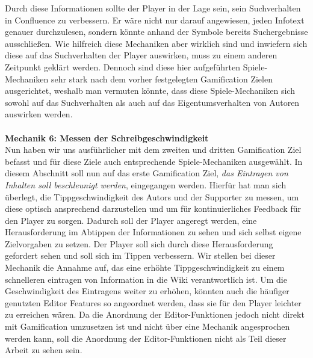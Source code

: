\documentclass[a4paper,12pt,twoside]{scrartcl}
\begin{document}
Durch diese Informationen sollte der Player in der Lage sein, sein Suchverhalten in Confluence zu verbessern. Er wäre nicht nur darauf angewiesen, jeden Infotext genauer durchzulesen, sondern könnte anhand der Symbole bereits Suchergebnisse ausschließen. Wie hilfreich diese Mechaniken aber wirklich sind und inwiefern sich diese auf das Suchverhalten der Player auswirken, muss zu einem anderen Zeitpunkt geklärt werden. Dennoch sind diese hier aufgeführten Spiele-Mechaniken sehr stark nach dem vorher festgelegten Gamification Zielen ausgerichtet, weshalb man vermuten könnte, dass diese Spiele-Mechaniken sich sowohl auf das Suchverhalten als auch auf das Eigentumsverhalten von Autoren auswirken werden.
\\\\
\textbf{Mechanik 6: Messen der Schreibgeschwindigkeit}\\
Nun haben wir uns ausführlicher mit dem zweiten und dritten Gamification Ziel befasst und für diese Ziele auch entsprechende Spiele-Mechaniken ausgewählt. In diesem Abschnitt soll nun auf das erste Gamification Ziel, \textit{das Eintragen von Inhalten soll beschleunigt werden}, eingegangen werden. Hierfür hat man sich überlegt, die Tippgeschwindigkeit des Autors und der Supporter zu messen, um diese optisch ansprechend darzustellen und um für kontinuierliches Feedback für den Player zu sorgen. Dadurch soll der Player angeregt werden, eine Herausforderung im Abtippen der Informationen zu sehen und sich selbst eigene Zielvorgaben zu setzen. Der Player soll sich durch diese Herausforderung gefordert sehen und soll sich im Tippen verbessern. Wir stellen bei dieser Mechanik die Annahme auf, das eine erhöhte Tippgeschwindigkeit zu einem schnelleren eintragen von Information in die Wiki verantwortlich ist. Um die Geschwindigkeit des Eintragens weiter zu erhöhen, könnten auch die häufiger genutzten Editor Features so angeordnet werden, dass sie für den Player leichter zu erreichen wären. Da die Anordnung der Editor-Funktionen jedoch nicht direkt mit Gamification umzusetzen ist und nicht über eine Mechanik angesprochen werden kann, soll die Anordnung der Editor-Funktionen nicht als Teil dieser Arbeit zu sehen sein.
\\\\
\end{document}
